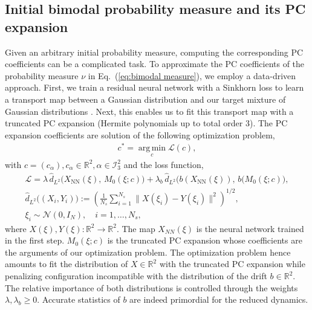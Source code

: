 \documentclass[11pt, a4paper, oneside, reqno]{amsart}
\begin{document}
\subsection{Initial bimodal probability measure and its PC expansion}\label{app:bimodal}
\noindent Given an arbitrary initial probability measure, computing the corresponding PC coefficients can be a complicated task. 
To approximate the PC coefficients of the probability measure $\nu$ in Eq.~(\ref{eq:bimodal measure}), we employ a data-driven approach. 
First, we train a residual neural network with a Sinkhorn loss to learn a transport map between a Gaussian distribution and our target mixture of Gaussian distributions \cite{feydy2019interpolating,feydy2019geomloss}. 
Next, this enables us to fit this transport map with a truncated PC expansion (Hermite polynomials up to total order 3). 
The PC expansion coefficients are solution of 
the following optimization problem,  
\sloppy
\begin{eqnarray}
    c^* = \operatorname*{arg\,min}_{c} \mathcal{L}(c),
\end{eqnarray}
with $c=(c_\alpha), c_\alpha\in\mathbb{R}^2, \alpha\in\mathcal{I}_3^2$
and the loss function,
\begin{eqnarray}
    \mathcal{L} = \lambda\, \hat{d}_{L^2}\big(X_{\text{NN}}(\xi),\, M_0(\xi; c)\big)
     + \lambda_b\, \hat{d}_{L^2}\big(b(X_{\text{NN}}(\xi)),\, b(M_0(\xi; c)\big), \\
    \hat{d}_{L^2}\big((X_i, Y_i)\big) := \left( \frac{1}{N_s} \sum_{i=1}^{N_s} \| X(\xi_i) - Y(\xi_i) \|^2 \right)^{1/2}, \nonumber  \\
    \xi_i \sim \mathcal{N}(0, I_N), \quad i = 1, \dots, N_s, \nonumber 
\end{eqnarray}
where $X(\xi), Y(\xi): \mathbb{R}^2\rightarrow\mathbb{R}^2$.%
The map $X_{NN}(\xi)$ is the neural network trained in the first step. $M_0(\xi; c)$ is the truncated PC expansion whose coefficients are the arguments of our optimization problem. 
The optimization problem hence amounts to fit the distribution of $X\in\mathbb{R}^2$ with the truncated PC expansion while penalizing configuration incompatible with the distribution of the drift $b\in\mathbb{R}^2$. The relative importance of both distributions is controlled through the weights $\lambda,\lambda_b\geq0$. Accurate statistics of $b$ are indeed primordial for the reduced dynamics.
\end{document}
